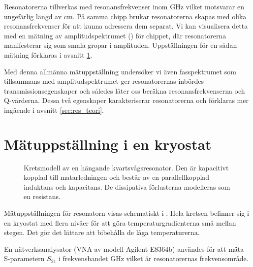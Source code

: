 \documentclass[main.tex]{subfiles}
\begin{document}
Resonatorerna tillverkas med resonansfrekvenser inom \unit[4-8]{GHz} vilket motsvarar en ungefärlig längd av \unit[1-2]{cm}. På samma chipp brukar resonatorerna skapas med olika resonansfrekvenser för att kunna adressera dem separat. Vi kan visualisera detta med en mätning av amplitudspektrumet () för chippet, där resonatorerna manifesterar sig som smala gropar i amplituden. Uppställningen för en sådan mätning förklaras i avsnitt \ref{sec:matuppstallning}.


Med denna allmänna mätuppställning undersöker vi även fasspektrumet som tillsammans med amplitudspektrumet ger resonatorernas inbördes transmissionsegenskaper och således låter oss beräkna resonansfrekvenserna och Q-värderna. Dessa två egenskaper karakteriserar resonatorerna och förklaras mer ingående i avsnitt \ref{sec:res_teori}.

\section{Mätuppställning i en kryostat}
\label{sec:matuppstallning}


\begin{figure}
\centering
{}
\begin{circuitikz}[line width=1pt,scale=0.7]

\end{circuitikz}
\caption{Kretsmodell av en hängande kvartsvågsresonator. Den är kapacitivt kopplad till matarledningen och består av en parallellkopplad induktans och kapacitans. De dissipativa förlusterna modelleras som en resistans.}
\label{fig:ekviv_krets}
\end{figure}
Mätuppställningen för resonatorn visas schematiskt i . Hela kretsen befinner sig i en kryostat med flera nivåer för att göra temperaturgradienterna små mellan stegen. Det gör det lättare att bibehålla de låga temperaturerna.

En nätverksanalysator (VNA av modell Agilent E8364b) användes för att mäta S-parametern $S_{21}$ i frekvensbandet \unit[4-8]{GHz} vilket är resonatorernas frekvensområde.
\end{document}
